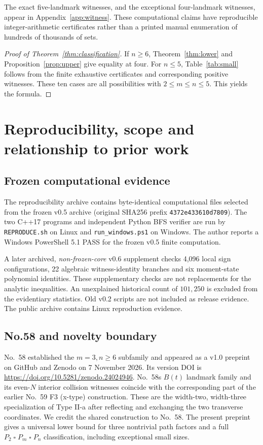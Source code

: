 \documentclass[10pt,a4paper]{article}
\newcommand{\boxp}{\mathbin{\square}}
\begin{document}
The exact five-landmark witnesses, and the exceptional four-landmark witnesses, appear in Appendix~\ref{app:witness}. These computational claims have reproducible integer-arithmetic certificates rather than a printed manual enumeration of hundreds of thousands of sets.

\begin{proof}[Proof of Theorem~\ref{thm:classification}]
If $n\ge6$, Theorem~\ref{thm:lower} and Proposition~\ref{prop:upper} give equality at four. For $n\le5$, Table~\ref{tab:small} follows from the finite exhaustive certificates and corresponding positive witnesses. These ten cases are all possibilities with $2\le m\le n\le5$. This yields the formula.
\end{proof}

\section{Reproducibility, scope and relationship to prior work}
\subsection{Frozen computational evidence}
The reproducibility archive contains byte-identical computational files selected from the frozen v0.5 archive (original SHA256 prefix \texttt{4372e433610d7809}). The two C++17 programs and independent Python BFS verifier are run by \texttt{REPRODUCE.sh} on Linux and \texttt{run\_windows.ps1} on Windows. The author reports a Windows PowerShell 5.1 PASS for the frozen v0.5 finite computation.

A later archived, \emph{non-frozen-core} v0.6 supplement checks 4,096 local sign configurations, 22 algebraic witness-identity branches and six moment-state polynomial identities. These supplementary checks are not replacements for the analytic inequalities. An unexplained historical count of $101{,}250$ is excluded from the evidentiary statistics. Old v0.2 scripts are not included as release evidence. The public archive contains Linux reproduction evidence.

\subsection{No.58 and novelty boundary}
No.~58 \cite{Yonezu58} established the $m=3,n\ge6$ subfamily and appeared as a v1.0 preprint on GitHub and Zenodo on 7 November 2026. Its version DOI is \url{https://doi.org/10.5281/zenodo.24024946}. No.~58\textquotesingle s $B(t)$ landmark family and its even-$N$ interior collision witnesses coincide with the corresponding part of the earlier No.~59 F3 (x-type) construction. These are the width-two, width-three specialization of Type II-a after reflecting and exchanging the two transverse coordinates. We credit the shared construction to No.~58. The present preprint gives a universal lower bound for three nontrivial path factors and a full $P_2\boxp P_m\boxp P_n$ classification, including exceptional small sizes.
\end{document}
